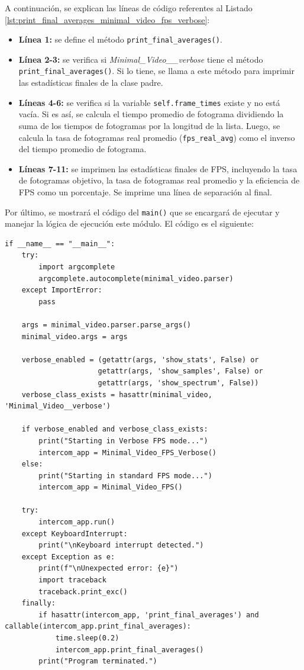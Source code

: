 A continuación, se explican las líneas de código referentes al Listado \ref{lst:print_final_averages_minimal_video_fps_verbose}:
\begin{itemize}
    \item \textbf{Línea 1:} se define el método \texttt{print\_final\_averages()}.
    \item \textbf{Línea 2-3:} se verifica si \textit{Minimal\_Video\_\_verbose} tiene el método \texttt{print\_final\_averages()}. Si lo tiene, se llama a este método para imprimir las estadísticas finales de la clase padre.
    \item \textbf{Líneas 4-6:} se verifica si la variable \texttt{self.frame\_times} existe y no está vacía. Si es así, se calcula el tiempo promedio de fotograma dividiendo la suma de los tiempos de fotogramas por la longitud de la lista. Luego, se calcula la tasa de fotogramas real promedio (\texttt{fps\_real\_avg}) como el inverso del tiempo promedio de fotograma.
    \item \textbf{Líneas 7-11:} se imprimen las estadísticas finales de FPS, incluyendo la tasa de fotogramas objetivo, la tasa de fotogramas real promedio y la eficiencia de FPS como un porcentaje. Se imprime una línea de separación al final.
\end{itemize}
\vspace{\baselineskip}

Por último, se mostrará el código del \texttt{main()} que se encargará de ejecutar y manejar la lógica de ejecución este módulo. El código es el siguiente:
\begin{lstlisting}[style=pythonstyle, caption={Listado del \texttt{main()} de Minimal\_Video\_FPS.}, label={lst:main_fps}]
if __name__ == "__main__":
    try:
        import argcomplete
        argcomplete.autocomplete(minimal_video.parser)
    except ImportError:
        pass
    
    args = minimal_video.parser.parse_args()
    minimal_video.args = args
    
    verbose_enabled = (getattr(args, 'show_stats', False) or
                      getattr(args, 'show_samples', False) or
                      getattr(args, 'show_spectrum', False))
    verbose_class_exists = hasattr(minimal_video, 'Minimal_Video__verbose')
    
    if verbose_enabled and verbose_class_exists:
        print("Starting in Verbose FPS mode...")
        intercom_app = Minimal_Video_FPS_Verbose()
    else:
        print("Starting in standard FPS mode...")
        intercom_app = Minimal_Video_FPS()

    try:
        intercom_app.run()
    except KeyboardInterrupt:
        print("\nKeyboard interrupt detected.")
    except Exception as e:
        print(f"\nUnexpected error: {e}")
        import traceback
        traceback.print_exc()
    finally:
        if hasattr(intercom_app, 'print_final_averages') and callable(intercom_app.print_final_averages):
            time.sleep(0.2)
            intercom_app.print_final_averages()
        print("Program terminated.")
\end{lstlisting}
\vspace{\baselineskip}

